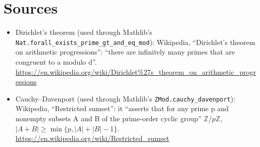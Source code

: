\documentclass[11pt]{article}
\theoremstyle{definition}
\begin{document}
\section{Sources}
\begin{itemize}
\item Dirichlet's theorem (used through Mathlib's \texttt{Nat.forall\_exists\_prime\_gt\_and\_eq\_mod}):
  Wikipedia, ``Dirichlet's theorem on arithmetic progressions'': ``there are infinitely many primes
  that are congruent to a modulo d''.
  \url{https://en.wikipedia.org/wiki/Dirichlet%27s_theorem_on_arithmetic_progressions}
\item Cauchy--Davenport (used through Mathlib's \texttt{ZMod.cauchy\_davenport}): Wikipedia,
  ``Restricted sumset'': it ``asserts that for any prime p and nonempty subsets A and B of the
  prime-order cyclic group'' $\mathbb{Z}/p\mathbb{Z}$, $|A+B|\ge\min\{p,|A|+|B|-1\}$.
  \url{https://en.wikipedia.org/wiki/Restricted_sumset}
\end{itemize}
\end{document}
